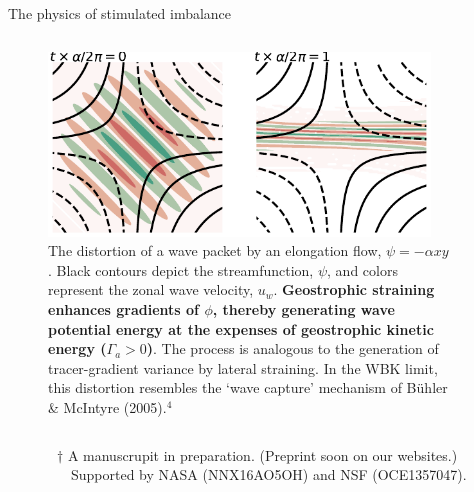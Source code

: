 \documentclass[final]{beamer}
\begin{document}
\begin{frame}[t]
\begin{columns}[t]
\begin{column}{0.425\paperwidth}
{\begin{alertblock}{The physics of stimulated imbalance}
\begin{columns}
                \begin{column}{0.535\textwidth}
                  \vskip1.75cm
                  \begin{figure}
                    \includegraphics[width=0.95\textwidth]{figs/Gamma_a.pdf}
                    \caption{The distortion of a wave packet by an elongation flow,
                    $\psi = -\alpha xy$.
                    Black contours depict the
                    streamfunction, $\psi$, and colors represent the zonal wave velocity,
                    $u_w$.
                              \textbf{Geostrophic straining enhances gradients of $\phi$,
                              thereby generating wave potential energy at the expenses
                              of geostrophic kinetic energy ($\Gamma_a>0$)}. The
                              process is analogous to the generation of tracer-gradient
                              variance by lateral straining. In the WBK limit, this
                              distortion resembles the `wave capture' mechanism of
                              B{\"u}hler \& McIntyre (2005).$^4$}
                  \end{figure}
                \end{column}

                \end{columns}
      \end{alertblock}
      }
      \vskip0.5cm
      ~~~~~~~$\dagger$ A manuscrupit in preparation. (Preprint soon on our websites.)\\
      ~~~~~~~~~Supported by NASA (NNX16AO5OH) and NSF (OCE1357047).
    \end{column}


    \hspace{1.cm}

    \begin{column}{0.55\textwidth}


\end{column}
\end{columns}
\end{frame}
\end{document}
